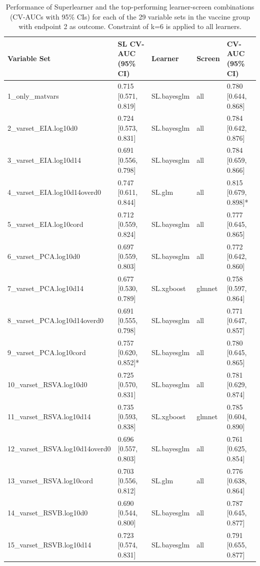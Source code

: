 \documentclass[11pt]{article}
\begin{document}
\begin{table}[!h]

\caption{\label{tab:SLperformance-vacc-y2}Performance of Superlearner and the top-performing learner-screen combinations (CV-AUCs with 95\% CIs) for each of the 29 variable sets in the vaccine group with endpoint 2 as outcome. Constraint of k=6 is applied to all learners.}
\centering
\fontsize{8}{10}\selectfont
\begin{threeparttable}
\begin{tabular}[t]{lllll}
\toprule
Variable Set & SL CV-AUC (95\% CI) & Learner & Screen & CV-AUC (95\% CI)\\
\midrule
1\_only\_matvars & 0.715 [0.571, 0.819] & SL.bayesglm & all & 0.780 [0.644, 0.868]\\
2\_varset\_EIA.log10d0 & 0.724 [0.573, 0.831] & SL.bayesglm & all & 0.784 [0.642, 0.876]\\
3\_varset\_EIA.log10d14 & 0.691 [0.556, 0.798] & SL.bayesglm & all & 0.784 [0.659, 0.866]\\
4\_varset\_EIA.log10d14overd0 & 0.747 [0.611, 0.844] & SL.glm & all & 0.815 [0.679, 0.898]*\\
5\_varset\_EIA.log10cord & 0.712 [0.559, 0.824] & SL.bayesglm & all & 0.777 [0.645, 0.865]\\
6\_varset\_PCA.log10d0 & 0.697 [0.559, 0.803] & SL.bayesglm & all & 0.772 [0.642, 0.860]\\
7\_varset\_PCA.log10d14 & 0.677 [0.530, 0.789] & SL.xgboost & glmnet & 0.758 [0.597, 0.864]\\
8\_varset\_PCA.log10d14overd0 & 0.691 [0.555, 0.798] & SL.bayesglm & all & 0.771 [0.647, 0.857]\\
9\_varset\_PCA.log10cord & 0.757 [0.620, 0.852]* & SL.bayesglm & all & 0.780 [0.645, 0.865]\\
10\_varset\_RSVA.log10d0 & 0.725 [0.570, 0.831] & SL.bayesglm & all & 0.781 [0.629, 0.874]\\
11\_varset\_RSVA.log10d14 & 0.735 [0.593, 0.838] & SL.xgboost & glmnet & 0.785 [0.604, 0.890]\\
12\_varset\_RSVA.log10d14overd0 & 0.696 [0.557, 0.803] & SL.bayesglm & all & 0.761 [0.625, 0.854]\\
13\_varset\_RSVA.log10cord & 0.703 [0.556, 0.812] & SL.glm & all & 0.776 [0.638, 0.864]\\
14\_varset\_RSVB.log10d0 & 0.690 [0.544, 0.800] & SL.bayesglm & all & 0.787 [0.645, 0.877]\\
15\_varset\_RSVB.log10d14 & 0.723 [0.574, 0.831] & SL.bayesglm & all & 0.791 [0.655, 0.877]\\

\end{tabular}
\end{threeparttable}
\end{table}
\end{document}
